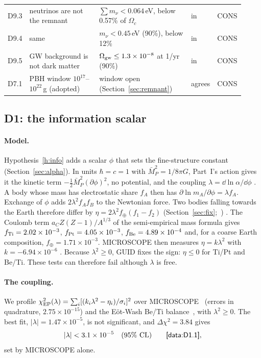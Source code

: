 {\begin{longtable}{@{}p{0.056\linewidth}p{0.30\linewidth}p{0.397\linewidth}p{0.107\linewidth}p{0.058\linewidth}@{}}
D9.3 & neutrinos are not the remnant & $\sum m_\nu<0.064$\,eV, below 0.57\% of $\Omega_c$ \cite{desi2} & in & CONS\\
D9.4 & same & $m_\nu<0.45$\,eV (90\%), below 12\% \cite{katrin2025} & in & CONS\\
D9.5 & GW background is not dark matter & $\Omega_{\rm gw}\le1.3\times10^{-8}$ at 1/yr (90\%) \cite{nanograv} & in & CONS\\
D7.1 & PBH window $10^{17}$--$10^{22}$\,g (adopted) & window open \cite{gortongreen} (Section~\ref{sec:remnant}) & agrees & CONS\\
\end{longtable}}

\subsection{D1: the information scalar}\label{sec:data-alpha}

\paragraph{Model.} Hypothesis~\ref{h:info} adds a scalar $\phi$ that sets the fine-structure constant (Section~\ref{sec:alpha}). In units
$\hbar=c=1$ with $\bar M_P^2=1/8\pi G$, Part~I's action gives it the kinetic term $-\tfrac12\bar M_P^2(\partial\phi)^2$, no potential, and the
coupling $\lambda=\dd\ln\alpha/\dd\phi$ \tagH. A body whose mass has electrostatic share $f_A$ then has $\partial\ln m_A/\partial\phi=\lambda
f_A$. Exchange of $\phi$ adds $2\lambda^2f_Af_B$ to the Newtonian force. Two bodies falling towards the Earth therefore differ by
$\eta=2\lambda^2f_\oplus(f_1-f_2)$ (Section~\ref{sec:fix};~\cite{dz}) \tagP. The Coulomb term $a_CZ(Z-1)/A^{1/3}$ of the semi-empirical mass
formula gives $f_{\rm Ti}=2.02\times10^{-3}$, $f_{\rm Pt}=4.05\times10^{-3}$, $f_{\rm Be}=4.89\times10^{-4}$ and, for a coarse Earth
composition, $f_\oplus=1.71\times10^{-3}$. MICROSCOPE then measures $\eta=k\lambda^2$ with $k=-6.94\times10^{-6}$ . Because
$\lambda^2\ge0$, GUID fixes the sign: $\eta\le0$ for Ti/Pt and Be/Ti. These tests can therefore fail although $\lambda$ is free.

\paragraph{The coupling.} We profile $\chi^2_{\rm EP}(\lambda)=\sum_i[(k_i\lambda^2-\eta_i)/\sigma_i]^2$ over MICROSCOPE~\cite{microscope}
(errors in quadrature, $2.75\times10^{-15}$) and the E\"ot-Wash Be/Ti balance~\cite{schlamminger2008}, with $\lambda^2\ge0$. The best fit,
$|\lambda|=1.47\times10^{-5}$, is not significant, and $\Delta\chi^2=3.84$ gives
\begin{equation}\label{eq:data-lambda}
|\lambda|<3.1\times10^{-5}\quad(95\%\ \mathrm{CL})\qquad\textsf{[data:D1.1]},
\end{equation}
set by MICROSCOPE alone.

